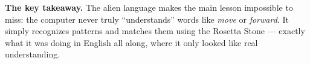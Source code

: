 \documentclass[a4]{article}
\begin{document}
\noindent\textbf{The key takeaway.} The alien language makes the main lesson
impossible to miss: the computer never truly ``understands'' words like
\emph{move} or \emph{forward}. It simply recognizes patterns and matches them using
the Rosetta Stone --- exactly what it was doing in English all along, where it only
looked like real understanding.

\end{document}
